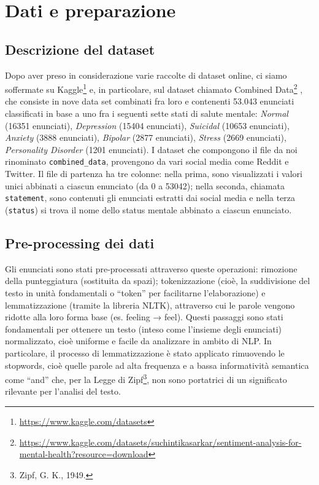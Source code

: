\documentclass[11pt]{article}
\begin{document}
\section{Dati e preparazione}
\subsection{Descrizione del dataset}
\label{sect:pdf}

Dopo aver preso in considerazione varie raccolte di dataset online, ci siamo soffermate su Kaggle\footnote{\url{https://www.kaggle.com/datasets}} e, in particolare, sul dataset chiamato Combined Data\footnote{\url{https://www.kaggle.com/datasets/suchintikasarkar/sentiment-analysis-for-mental-health?resource=download}} , che consiste in nove data set combinati fra loro e contenenti 53.043 enunciati classificati in base a uno fra i seguenti sette stati di salute mentale: \textit{Normal} (16351 enunciati), \textit{Depression} (15404 enunciati), \textit{Suicidal} (10653 enunciati), \textit{Anxiety} (3888 enunciati), \textit{Bipolar} (2877 enunciati), \textit{Stress} (2669 enunciati), \textit{Personality Disorder} (1201 enunciati). I dataset che compongono il file da noi rinominato \texttt{combined\_data}, provengono da vari social media come Reddit e Twitter. Il file di partenza ha tre colonne: nella prima, sono visualizzati i valori unici abbinati a ciascun enunciato (da 0 a 53042); nella seconda, chiamata \texttt{statement}, sono contenuti gli enunciati estratti dai social media e nella terza (\texttt{status}) si trova il nome dello status mentale abbinato a ciascun enunciato.

\subsection{Pre-processing dei dati}
\label{ssec:layout}

Gli enunciati sono stati pre-processati attraverso queste operazioni: rimozione della punteggiatura (sostituita da spazi); tokenizzazione (cioè, la suddivisione del testo in unità fondamentali o “token” per facilitarne l’elaborazione) e lemmatizzazione (tramite la libreria NLTK), attraverso cui le parole vengono ridotte alla loro forma base (es. feeling → feel). Questi passaggi sono stati fondamentali per ottenere un testo (inteso come l’insieme degli enunciati) normalizzato, cioè uniforme e facile da analizzare in ambito di NLP. In particolare, il processo di lemmatizzazione è stato applicato rimuovendo le stopwords, cioè quelle parole ad alta frequenza e a bassa informatività semantica come “and” che, per la Legge di Zipf\footnote{Zipf, G. K., 1949. },  non sono portatrici di un significato rilevante per l’analisi del testo. 
\end{document}
